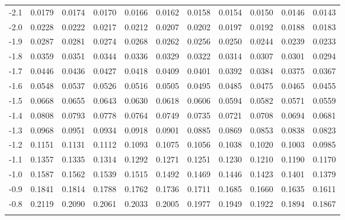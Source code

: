\begin{tabular}{l|llllllllll}
-2.1 & 0.0179 & 0.0174 & 0.0170 & 0.0166 & 0.0162 & 0.0158 & 0.0154 & 0.0150 & 0.0146 & 0.0143 \\\arrayrulecolor{light-gray}\hline\arrayrulecolor{black} 
-2.0 & 0.0228 & 0.0222 & 0.0217 & 0.0212 & 0.0207 & 0.0202 & 0.0197 & 0.0192 & 0.0188 & 0.0183 \\\arrayrulecolor{light-gray}\hline\arrayrulecolor{black} 
-1.9 & 0.0287 & 0.0281 & 0.0274 & 0.0268 & 0.0262 & 0.0256 & 0.0250 & 0.0244 & 0.0239 & 0.0233 \\\arrayrulecolor{light-gray}\hline\arrayrulecolor{black} 
-1.8 & 0.0359 & 0.0351 & 0.0344 & 0.0336 & 0.0329 & 0.0322 & 0.0314 & 0.0307 & 0.0301 & 0.0294 \\\arrayrulecolor{light-gray}\hline\arrayrulecolor{black} 
-1.7 & 0.0446 & 0.0436 & 0.0427 & 0.0418 & 0.0409 & 0.0401 & 0.0392 & 0.0384 & 0.0375 & 0.0367 \\\arrayrulecolor{light-gray}\hline\arrayrulecolor{black} 
-1.6 & 0.0548 & 0.0537 & 0.0526 & 0.0516 & 0.0505 & 0.0495 & 0.0485 & 0.0475 & 0.0465 & 0.0455 \\\arrayrulecolor{light-gray}\hline\arrayrulecolor{black} 
-1.5 & 0.0668 & 0.0655 & 0.0643 & 0.0630 & 0.0618 & 0.0606 & 0.0594 & 0.0582 & 0.0571 & 0.0559 \\\arrayrulecolor{light-gray}\hline\arrayrulecolor{black} 
-1.4 & 0.0808 & 0.0793 & 0.0778 & 0.0764 & 0.0749 & 0.0735 & 0.0721 & 0.0708 & 0.0694 & 0.0681 \\\arrayrulecolor{light-gray}\hline\arrayrulecolor{black} 
-1.3 & 0.0968 & 0.0951 & 0.0934 & 0.0918 & 0.0901 & 0.0885 & 0.0869 & 0.0853 & 0.0838 & 0.0823 \\\arrayrulecolor{light-gray}\hline\arrayrulecolor{black} 
-1.2 & 0.1151 & 0.1131 & 0.1112 & 0.1093 & 0.1075 & 0.1056 & 0.1038 & 0.1020 & 0.1003 & 0.0985 \\\arrayrulecolor{light-gray}\hline\arrayrulecolor{black} 
-1.1 & 0.1357 & 0.1335 & 0.1314 & 0.1292 & 0.1271 & 0.1251 & 0.1230 & 0.1210 & 0.1190 & 0.1170 \\\arrayrulecolor{light-gray}\hline\arrayrulecolor{black} 
-1.0 & 0.1587 & 0.1562 & 0.1539 & 0.1515 & 0.1492 & 0.1469 & 0.1446 & 0.1423 & 0.1401 & 0.1379 \\\arrayrulecolor{light-gray}\hline\arrayrulecolor{black} 
-0.9 & 0.1841 & 0.1814 & 0.1788 & 0.1762 & 0.1736 & 0.1711 & 0.1685 & 0.1660 & 0.1635 & 0.1611 \\\arrayrulecolor{light-gray}\hline\arrayrulecolor{black} 
-0.8 & 0.2119 & 0.2090 & 0.2061 & 0.2033 & 0.2005 & 0.1977 & 0.1949 & 0.1922 & 0.1894 & 0.1867 \\\arrayrulecolor{light-gray}\hline\arrayrulecolor{black} 

\end{tabular}
